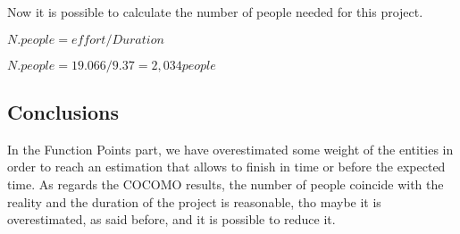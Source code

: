 		\vspace{0.5cm}
		Now it is possible to calculate	the number of people needed for this project.
		\vspace{0.5cm}
		\begin{center}
			\begin{math}
				N. people = effort / Duration
			\end{math}
		\end{center}
		\begin{center}
			\begin{math}
				N. people = 19.066 / 9.37 = 2,034 people
			\end{math}
		\end{center}
		\vspace{0.5cm}
	\subsection{Conclusions}
		In the Function Points part, we have overestimated some weight of the entities in order to reach an estimation that allows to finish in time or before the expected time. As regards the COCOMO results, the number of people coincide with the reality and the duration of the project is reasonable, tho maybe it is overestimated, as said before, and it is possible to reduce it.